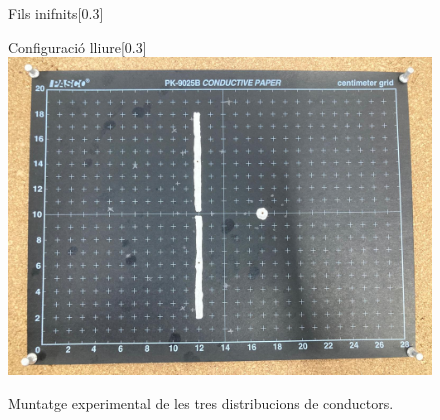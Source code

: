 \documentclass[11pt]{article}
\numberwithin{equation}{section}
\numberwithin{figure}{section}
\numberwithin{table}{section}
\begin{document}
\begin{figure}[H]
\begin{subcaptionbox}{Fils inifnits\label{fig:img2}}[0.3\textwidth]
    \end{subcaptionbox}
    \hfill
    \begin{subcaptionbox}{Configuració lliure\label{fig:img3}}[0.3\textwidth]
        {\includegraphics[width=\linewidth]{imatge3.jpg}}
    \end{subcaptionbox}

    \caption{Muntatge experimental de les tres distribucions de conductors.}
    \label{fig:figura3}
\end{figure}
\end{document}
